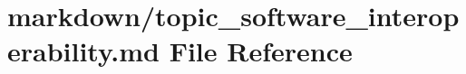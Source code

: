 \hypertarget{topic__software__interoperability_8md}{}\section{markdown/topic\+\_\+software\+\_\+interoperability.md File Reference}
\label{topic__software__interoperability_8md}
